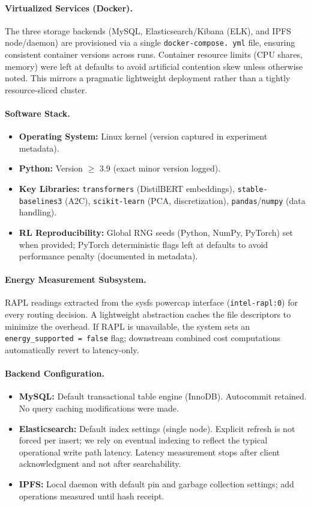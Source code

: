 \paragraph{Virtualized Services (Docker).} The three storage backends (MySQL, Elasticsearch/Kibana (ELK), and IPFS node/daemon) are provisioned via a single \texttt{docker-compose. yml} file, ensuring consistent container versions across runs. Container resource limits (CPU shares, memory) were left at defaults to avoid artificial contention skew unless otherwise noted. This mirrors a pragmatic lightweight deployment rather than a tightly resource-sliced cluster.

\paragraph{Software Stack.}
\begin{itemize}
  \item \textbf{Operating System:} Linux kernel (version captured in experiment metadata).
  \item \textbf{Python:} Version $\geq$ 3.9 (exact minor version logged).
  \item \textbf{Key Libraries:} \texttt{transformers} (DistilBERT embeddings), \texttt{stable-baselines3} (A2C), \texttt{scikit-learn} (PCA, discretization), \texttt{pandas}/\texttt{numpy} (data handling).
  \item \textbf{RL Reproducibility:} Global RNG seeds (Python, NumPy, PyTorch) set when provided; PyTorch deterministic flags left at defaults to avoid performance penalty (documented in metadata).
\end{itemize}

\paragraph{Energy Measurement Subsystem.} RAPL readings extracted from the sysfs powercap interface (\texttt{intel-rapl:0}) for every routing decision. A lightweight abstraction caches the file descriptors to minimize the overhead. If RAPL is unavailable, the system sets an \texttt{energy\_supported = false} flag; downstream combined cost computations automatically revert to latency-only.

\paragraph{Backend Configuration.}
\begin{itemize}
  \item \textbf{MySQL:} Default transactional table engine (InnoDB). Autocommit retained. No query caching modifications were made.
  \item \textbf{Elasticsearch:} Default index settings (single node). Explicit refresh is not forced per insert; we rely on eventual indexing to reflect the typical operational write path latency. Latency measurement stops after client acknowledgment and not after searchability.
  \item \textbf{IPFS:} Local daemon with default pin and garbage collection settings; add operations measured until hash receipt.
\end{itemize}

